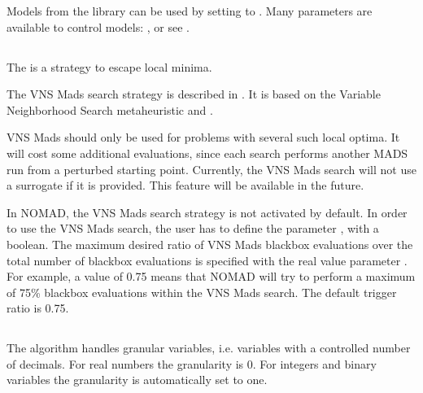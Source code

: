 \documentclass[letterpaper,10pt,english]{sphinxmanual}
\begin{document}
\sphinxAtStartPar
Models from the  library can be used by setting  to .
Many parameters are available to control  models: , or see {\hyperref[\detokenize{SgteLib:sgtelib}]{}}.


\subsection{}
\label{\detokenize{AdvancedFunctionalities:vns-mads-search}}\label{\detokenize{AdvancedFunctionalities:vns-search}}
\sphinxAtStartPar
The  is a strategy to escape local minima.

\sphinxAtStartPar
The VNS Mads search strategy is described in . It is based on the Variable Neighborhood Search metaheuristic  and .

\sphinxAtStartPar
VNS Mads should only be used for problems with several such local optima. It will cost some additional evaluations, since each search performs another MADS run from a perturbed starting point. Currently, the VNS Mads search will not use a surrogate if it is provided. This feature will be available in the future.

\sphinxAtStartPar
In NOMAD, the VNS Mads search strategy is not activated by default. In order to use the VNS Mads search, the user has to define the parameter , with a boolean. The maximum desired ratio of VNS Mads blackbox evaluations over the total number of blackbox evaluations is specified with the real value parameter . For example, a value of 0.75 means that  NOMAD will try to perform a maximum of 75\% blackbox evaluations  within the VNS Mads search. The default trigger ratio is 0.75.


\subsection{}
\label{\detokenize{AdvancedFunctionalities:granularity}}\label{\detokenize{AdvancedFunctionalities:id10}}
\sphinxAtStartPar
The  algorithm handles granular variables, i.e. variables with a controlled number of decimals.
For real numbers the granularity is 0. For integers and binary variables the granularity is automatically set to one.
\end{document}
